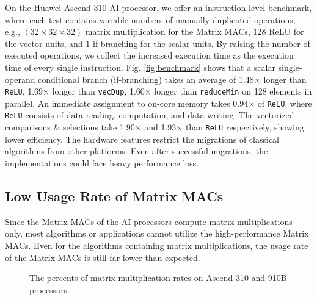 On the Huawei Ascend 310 AI processor, we offer an instruction-level benchmark, where each test contains variable numbers of manually duplicated operations, e.g., $(32 \times 32 \times 32)$ matrix multiplication for the Matrix MACs, $128$ ReLU for the vector units, and $1$ if-branching for the scalar units. By raising the number of executed operations, we collect the increased execution time as the execution time of every single instruction. Fig. \ref{fig:benchmark} shows that a scalar single-operand conditional branch (if-branching) takes an average of 1.48$\times$ longer than \verb|ReLU|, 1.69$\times$ longer than \verb|vecDup|, 1.60$\times$ longer than \verb|reduceMin| on 128 elements in parallel. An immediate assignment to on-core memory takes 0.94$\times$ of \verb|ReLU|, where \verb|ReLU| consists of data reading, computation, and data writing. The vectorized comparisons \& selections take 1.90$\times$ and 1.93$\times$ than \verb|ReLU| respectively, showing lower efficiency. The hardware features restrict the migrations of classical algorithms from other platforms. Even after successful migrations, the implementations could face heavy performance loss.

\subsection{Low Usage Rate of Matrix MACs}

Since the Matrix MACs of the AI processors compute matrix multiplications only, most algorithms or applications cannot utilize the high-performance Matrix MACs. Even for the algorithms containing matrix multiplications, the usage rate of the Matrix MACs is still far lower than expected.

\begin{figure}[tbp]
    \caption{The percents of matrix multiplication rates on Ascend 310 and 910B processors}
    \label{fig:back_flash}
    \end{figure}


